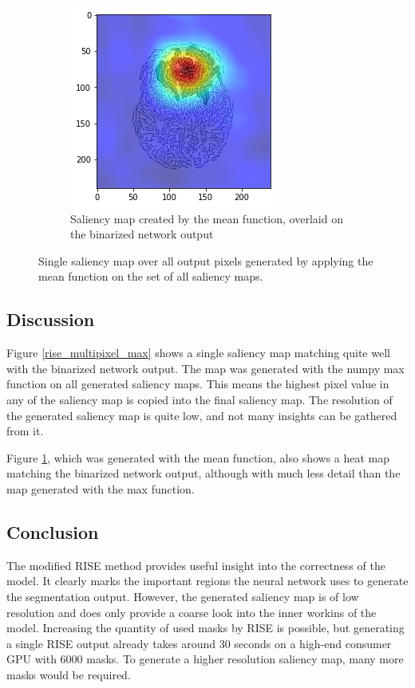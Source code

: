 \begin{figure}[H]
\begin{subfigure}[t]{.4\textwidth}
        \includegraphics[width=\linewidth]{chapters/04_segmentation/images/rise_multipixel_mean_2-1.png}
        \caption{Saliency map created by the mean function, overlaid on the binarized network output}
    \end{subfigure}
    \caption{Single saliency map over all output pixels generated by applying the mean function on the set of all saliency maps.}
    \label{rise_multipixel_mean}
\end{figure}

\subsection{Discussion}
Figure \ref{rise_multipixel_max} shows a single saliency map matching quite well with the binarized network output. The map was generated with the numpy max function on all generated saliency maps. This means the highest pixel value in any of the saliency map is copied into the final saliency map. The resolution of the generated saliency map is quite low, and not many insights can be gathered from it.

Figure \ref{rise_multipixel_mean}, which was generated with the mean function, also shows a heat map matching the binarized network output, although with much less detail than the map generated with the max function.

\subsection{Conclusion}
The modified RISE method provides useful insight into the correctness of the model. It clearly marks the important regions the neural network uses to generate the segmentation output. However, the generated saliency map is of low resolution and does only provide a coarse look into the inner workins of the model. Increasing the quantity of used masks by RISE is possible, but generating a single RISE output already takes around 30 seconds on a high-end consumer GPU with 6000 masks. To generate a higher resolution saliency map, many more masks would be required.
